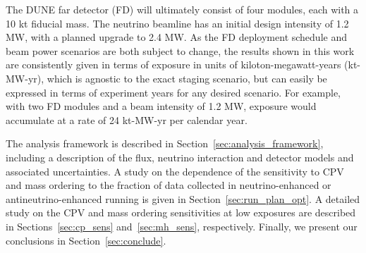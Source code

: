 The DUNE far detector (FD) will ultimately consist of four modules, each with a 10 kt fiducial mass. The neutrino beamline has an initial design intensity of 1.2 MW, with a planned upgrade to 2.4 MW. As the FD deployment schedule and beam power scenarios are both subject to change, the results shown in this work are consistently given in terms of exposure in units of kiloton-megawatt-years (kt-MW-yr), which is agnostic to the exact staging scenario, but can easily be expressed in terms of experiment years for any desired scenario. For example, with two FD modules and a beam intensity of 1.2 MW, exposure would accumulate at a rate of 24 kt-MW-yr per calendar year.

The analysis framework is described in Section~\ref{sec:analysis_framework}, including a description of the flux, neutrino interaction and detector models and associated uncertainties. A study on the dependence of the sensitivity to CPV and mass ordering to the fraction of data collected in neutrino-enhanced or antineutrino-enhanced running is given in Section~\ref{sec:run_plan_opt}. A detailed study on the CPV and mass ordering sensitivities at low exposures are described in Sections~\ref{sec:cp_sens} and~\ref{sec:mh_sens}, respectively. Finally, we present our conclusions in Section~\ref{sec:conclude}.

